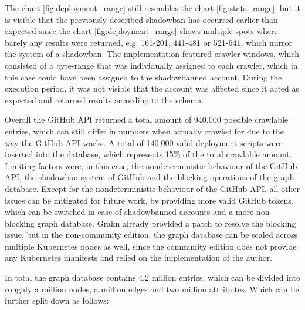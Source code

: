 The chart \ref{fig:deployment_range} still resembles the chart \ref{fig:stats_range}, but it is visible that the previously described shadowban has occurred earlier than expected since the chart \ref{fig:deployment_range} shows multiple spots where barely any results were returned, e.g. 161-201, 441-481 or 521-641, which mirror the system of a shadowban. The implementation featured crawler windows, which consisted of a byte-range that was individually assigned to each crawler, which in this case could have been assigned to the shadowbanned account. During the execution period, it was not visible that the account was affected since it acted as expected and returned results according to the schema.

Overall the GitHub API returned a total amount of 940,000 possible crawlable entries, which can still differ in numbers when actually crawled for due to the way the GitHub API works. A total of 140,000 valid deployment scripts were inserted into the database, which represents 15\% of the total crawlable amount. Limiting factors were, in this case, the nondeterministic behaviour of the GitHub API, the shadowban system of GitHub and the blocking operations of the graph database. Except for the nondeterministic behaviour of the GitHub API, all other issues can be mitigated for future work, by providing more valid GitHub tokens, which can be switched in case of shadowbanned accounts and a more non-blocking graph database. Grakn already provided a patch to resolve the blocking issue, but in the non-community edition, the graph database can be scaled across multiple Kubernetes nodes as well, since the community edition does not provide any Kubernetes manifests and relied on the implementation of the author.

In total the graph database contains 4,2 million entries, which can be divided into roughly a million nodes, a million edges and two million attributes. Which can be further split down as follows:

